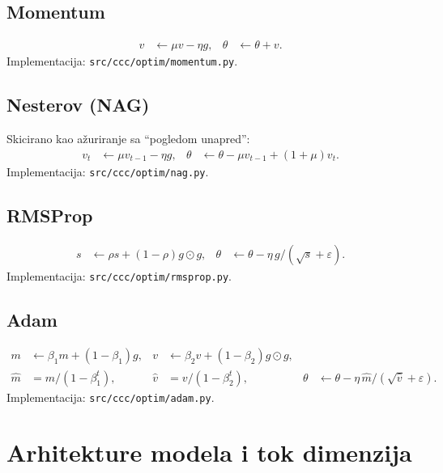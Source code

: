 \documentclass[11pt,a4paper]{article}
\begin{document}
\subsection{Momentum}\vspace{-6pt}
\begin{align}
 v &\leftarrow \mu v - \eta g, & \theta &\leftarrow \theta + v.
\end{align}
Implementacija: \texttt{src/ccc/optim/momentum.py}.

\subsection{Nesterov (NAG)}\vspace{-6pt}
Skicirano kao ažuriranje sa ``pogledom unapred'':
\begin{align}
 v_{t} &\leftarrow \mu v_{t-1} - \eta g, & \theta &\leftarrow \theta - \mu v_{t-1} + (1+\mu) v_t.
\end{align}
Implementacija: \texttt{src/ccc/optim/nag.py}.

\subsection{RMSProp}\vspace{-6pt}
\begin{align}
 s &\leftarrow \rho s + (1-\rho) g\odot g, & \theta &\leftarrow \theta - \eta\, g / (\sqrt{s}+\varepsilon).
\end{align}
Implementacija: \texttt{src/ccc/optim/rmsprop.py}.

\subsection{Adam}\vspace{-6pt}
\begin{align}
 m &\leftarrow \beta_1 m + (1-\beta_1) g, & v &\leftarrow \beta_2 v + (1-\beta_2) g\odot g,\\
 \hat m &= m/(1-\beta_1^t), & \hat v &= v/(1-\beta_2^t), & \theta &\leftarrow \theta - \eta\, \hat m / (\sqrt{\hat v}+\varepsilon).
\end{align}
Implementacija: \texttt{src/ccc/optim/adam.py}.

\section{Arhitekture modela i tok dimenzija}
\end{document}
